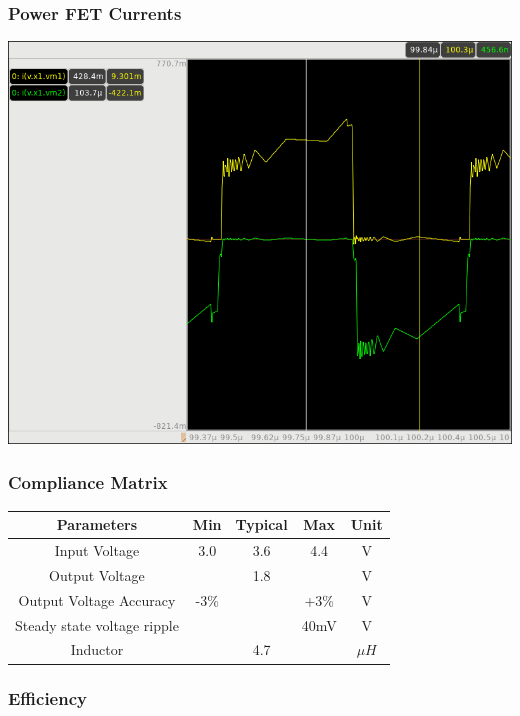 \documentclass{beamer}
\begin{document}
\begin{frame}
  \frametitle{Power FET Currents}
  \includegraphics[scale=0.25]{hiside-lowside-current.png}
\end{frame}

\begin{frame}
  \frametitle{Compliance Matrix}
  \begin{center}
    \begin{tabular}{| c | c | c | c | c  |}
      \hline      
      Parameters & Min & Typical & Max & Unit \\
      \hline
      Input Voltage & 3.0 & 3.6 & 4.4 & V \\
      Output Voltage & & 1.8 &  & V \\
      Output Voltage Accuracy & -3\% & & +3\% & V \\
      Steady state voltage ripple &  & & 40mV & V \\
      Inductor & & 4.7 & & $\mu H$ \\
    \end{tabular}
  \end{center}

\end{frame}



\begin{frame}
  \frametitle{Efficiency}
\end{frame}
\end{document}
